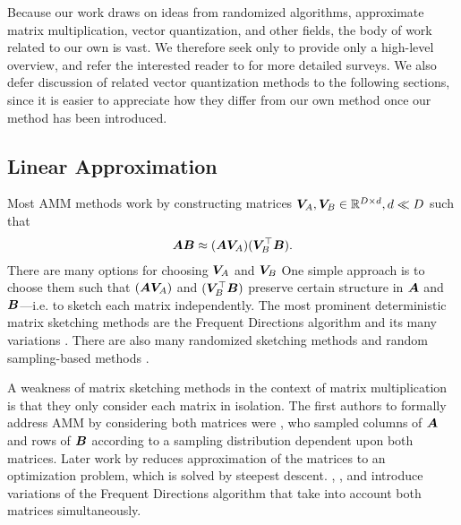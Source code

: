 
Because our work draws on ideas from randomized algorithms, approximate matrix multiplication, vector quantization, and other fields, the body of work related to our own is vast. We therefore seek only to provide only a high-level overview, and refer the interested reader to \cite{learningToHashSurvey, hashingSimilaritySurvey, isvd} for more detailed surveys. We also defer discussion of related vector quantization methods to the following sections, since it is easier to appreciate how they differ from our own method once our method has been introduced.

\subsection{Linear Approximation}

Most AMM methods work by constructing matrices $\bm{V}_A, \bm{V}_B \in \mathbb{R}^{D \times d}, d \ll D$ such that
\begin{align}
    \bm{A} \bm{B} \approx (\bm{A} \bm{V}_A) (\bm{V}_B^\top \bm{B}).
\end{align}
There are many options for choosing $\bm{V}_A$ and $\bm{V}_B$
One simple approach is to choose them such that $(\bm{A} \bm{V}_A)$ and $(\bm{V}_B^\top \bm{B})$ preserve certain structure in $\bm{A}$ and $\bm{B}$---i.e. to sketch each matrix independently. The most prominent deterministic matrix sketching methods are the Frequent Directions algorithm \cite{liberty_simple_2012, ghashami_frequent_2016} and its many variations \cite{teng_fast_2019, francis_practical_2018, ye_frequent_2016, huang_near_2019, luo_robust_2019, francis_improvement_2018}. There are also many randomized sketching methods \cite{sarlos_improved_2006, kyrillidis_approximate_2014, pagh_compressed_2013, hashjl,osnap} and random sampling-based methods \cite{drineas_fast_2006-1, drineas_fast_2006-2}.

A weakness of matrix sketching methods in the context of matrix multiplication is that they only consider each matrix in isolation. The first authors to formally address AMM by considering both matrices were \citet{drineas_fast_2006}, who sampled columns of $\bm{A}$ and rows of $\bm{B}$ according to a sampling distribution dependent upon both matrices. Later work by \citet{manne_fast_2014} reduces approximation of the matrices to an optimization problem, which is solved by steepest descent. \citet{mroueh_co-occuring_2016}, \citet{ye_frequent_2016}, and \citet{francis_improvement_2018} introduce variations of the Frequent Directions algorithm that take into account both matrices simultaneously.

